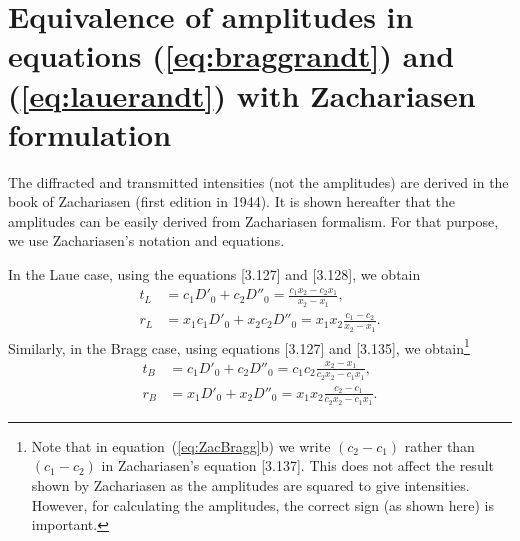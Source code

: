 \documentclass{iucr}
\begin{document}
\section{Equivalence of amplitudes in equations (\ref{eq:braggrandt}) and (\ref{eq:lauerandt}) with Zachariasen formulation}
\label{appendix:zachariasen}

The diffracted and transmitted intensities (not the amplitudes) are derived in the book of Zachariasen \cite{ZachariasenBook} (first edition in 1944). It is shown hereafter that the amplitudes can be easily derived from Zachariasen formalism. For that purpose, we use Zachariasen's notation and equations. 

In the Laue case, using the equations [3.127] and [3.128], we obtain
 	\begin{subequations}
    \label{eq:ZacLaue}
    \begin{align}
    t_L &= c_1 D'_0 + c_2 D''_0 = \frac{c_1 x_2 - c_2 x_1}{x_2-x_1},\\
    r_L &= x_1 c_1 D'_0 + x_2 c_2 D''_0 = x_1 x_2 \frac{c_1 - c_2}{x_2-x_1}.
    \end{align}
	\end{subequations}
Similarly, in the Bragg case, using equations [3.127] and [3.135], we obtain\footnote{Note that in equation~(\ref{eq:ZacBragg}b) we write $(c_2-c_1)$ rather than $(c_1-c_2)$ in Zachariasen's equation [3.137]. This does not affect the result shown by Zachariasen as the amplitudes are squared to give intensities. However, for calculating the amplitudes, the correct sign (as shown here) is important.}
 	\begin{subequations}
    \label{eq:ZacBragg}
    \begin{align}
    t_B &= c_1 D'_0 + c_2 D''_0 = c_1 c_2 \frac{x_2 - x_1}{c_2 x_2-c_1 x_1},\\
    r_B &= x_1 D'_0 + x_2 D''_0 = x_1 x_2 \frac{c_2 - c_1}{c_2 x_2-c_1 x_1}.
    \end{align}
	\end{subequations}


\end{document}
